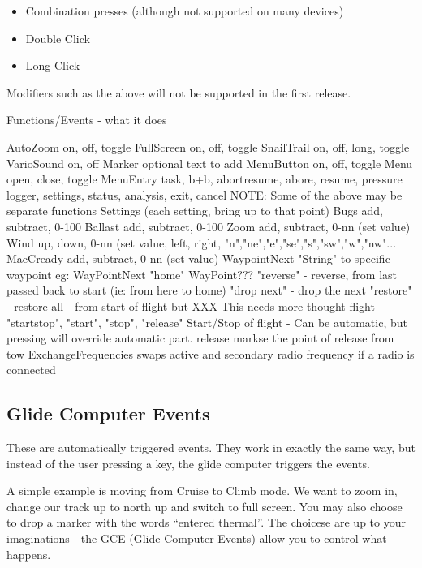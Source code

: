 \begin{itemize}
\item Combination presses (although not supported on many devices)
\item Double Click
\item Long Click
\end{itemize}

Modifiers such as the above will not be supported in the first release.

\begin{verb}
Functions/Events - what it does

AutoZoom		on, off, toggle 
FullScreen		on, off, toggle
SnailTrail 		on, off, long, toggle
VarioSound 		on, off
Marker 			optional text to add
MenuButton 		on, off, toggle
Menu			open, close, toggle
MenuEntry		task, b+b, abortresume, abore, resume, pressure
logger, settings, status, analysis, exit, cancel
NOTE: Some of the above may be separate functions
Settings		(each setting, bring up to that point)
Bugs			add, subtract, 0-100%
Ballast			add, subtract, 0-100%
Zoom			add, subtract, 0-nn (set value)
Wind			up, down, 0-nn (set value, left, right, "n","ne","e","se","s","sw","w","nw"...
MacCready		add, subtract, 0-nn (set value)
WaypointNext		"String" to specific waypoint
eg: WayPointNext "home"
WayPoint???		"reverse" - reverse, from last passed back to start (ie: from here to home)
"drop next" - drop the next
"restore" - restore all - from start of flight but 
XXX This needs more thought
flight 			"startstop", "start", "stop", "release"
Start/Stop of flight - Can be automatic, but pressing will override
automatic part.
release 		markse the point of release from tow
ExchangeFrequencies	swaps active and secondary radio frequency if a radio is connected
\end{verb}

\subsection{Glide Computer Events}

These are automatically triggered events. They work in exactly the
same way, but instead of the user pressing a key, the glide computer
triggers the events.

A simple example is moving from Cruise to Climb mode. We want to zoom
in, change our track up to north up and switch to full screen. You may
also choose to drop a marker with the words ``entered thermal''. The
choicese are up to your imaginations - the GCE (Glide Computer Events)
allow you to control what happens.

